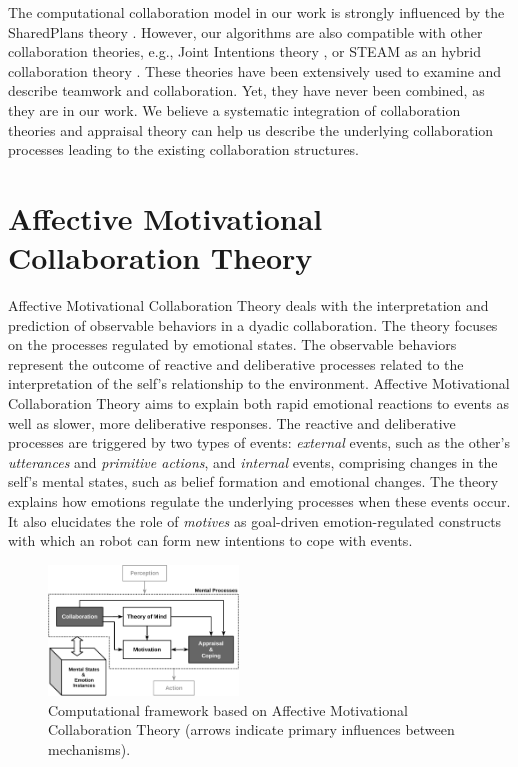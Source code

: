 \documentclass{aamas2016}
\begin{document}
The computational collaboration model in our work is strongly influenced by the
SharedPlans theory \cite{grosz:plans-discourse}. However, our algorithms are
also compatible with other collaboration theories, e.g., Joint Intentions theory
\cite{cohen:teamwork}, or STEAM as an hybrid collaboration theory
\cite{tambe:flexible-teamwork}. These theories have been extensively used to
examine and describe teamwork and collaboration. Yet, they have never been
combined, as they are in our work. We believe a systematic integration of
collaboration theories and appraisal theory can help us describe the underlying
collaboration processes leading to the existing collaboration structures.

\section{Affective Motivational Collaboration Theory}

Affective Motivational Collaboration Theory deals with the interpretation and
prediction of observable behaviors in a dyadic collaboration. The theory focuses
on the processes regulated by emotional states. The observable behaviors
represent the outcome of reactive and deliberative processes related to the
interpretation of the self's relationship to the environment. Affective
Motivational Collaboration Theory aims to explain both rapid emotional reactions
to events as well as slower, more deliberative responses. The reactive and
deliberative processes are triggered by two types of events: \textit{external}
events, such as the other's \textit{utterances} and \textit{primitive actions},
and \textit{internal} events, comprising changes in the self's mental states,
such as belief formation and emotional changes. The theory explains how emotions
regulate the underlying processes when these events occur. It also elucidates
the role of \textit{motives} as goal-driven emotion-regulated constructs with
which an robot can form new intentions to cope with events.

\begin{figure}[tbh]
  \centering
  \includegraphics[width=0.45\textwidth]{figure/theory-general-croped.pdf}
  \caption{{\fontsize{9}{9}\selectfont Computational framework based on
  Affective Motivational Collaboration Theory (arrows indicate primary
  influences between mechanisms).}}
  \label{fig:cpm}
\end{figure}
\end{document}
